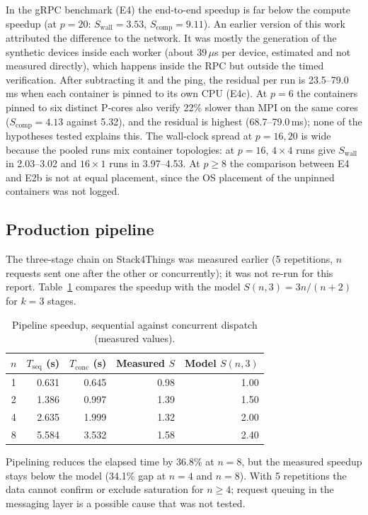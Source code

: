 \documentclass[10pt,a4paper]{article}
\begin{document}
In the gRPC benchmark (E4) the end-to-end speedup is far below the compute speedup (at $p=20$: $S_{\mathrm{wall}}=3.53$, $S_{\mathrm{comp}}=9.11$). An earlier version of this work attributed the difference to the network. It was mostly the generation of the synthetic devices inside each worker (about $39\,\mu$s per device, estimated and not measured directly), which happens inside the RPC but outside the timed verification. After subtracting it and the ping, the residual per run is 23.5--79.0\,ms when each container is pinned to its own CPU (E4c). At $p=6$ the containers pinned to six distinct P-cores also verify 22\% slower than MPI on the same cores ($S_{\mathrm{comp}}=4.13$ against 5.32), and the residual is highest (68.7--79.0\,ms); none of the hypotheses tested explains this. The wall-clock spread at $p=16,20$ is wide because the pooled runs mix container topologies: at $p=16$, $4\times4$ runs give $S_{\mathrm{wall}}$ in 2.03--3.02 and $16\times1$ runs in 3.97--4.53. At $p\ge8$ the comparison between E4 and E2b is not at equal placement, since the OS placement of the unpinned containers was not logged.

\subsection{Production pipeline}

The three-stage chain on Stack4Things was measured earlier (5 repetitions, $n$ requests sent one after the other or concurrently); it was not re-run for this report. Table~\ref{tab:pipe} compares the speedup with the model $S(n,3)=3n/(n+2)$ for $k=3$ stages.

\begin{table}[t]
\centering\small
\begin{tabular}{crrrr}
\toprule
$n$ & $T_{\mathrm{seq}}$ (s) & $T_{\mathrm{conc}}$ (s) & Measured $S$ & Model $S(n,3)$ \\
\midrule
1 & 0.631 & 0.645 & 0.98 & 1.00 \\
2 & 1.386 & 0.997 & 1.39 & 1.50 \\
4 & 2.635 & 1.999 & 1.32 & 2.00 \\
8 & 5.584 & 3.532 & 1.58 & 2.40 \\
\bottomrule
\end{tabular}
\caption{Pipeline speedup, sequential against concurrent dispatch (measured values).}
\label{tab:pipe}
\end{table}

Pipelining reduces the elapsed time by 36.8\% at $n=8$, but the measured speedup stays below the model (34.1\% gap at $n=4$ and $n=8$). With 5 repetitions the data cannot confirm or exclude saturation for $n\ge4$; request queuing in the messaging layer is a possible cause that was not tested.
\end{document}
